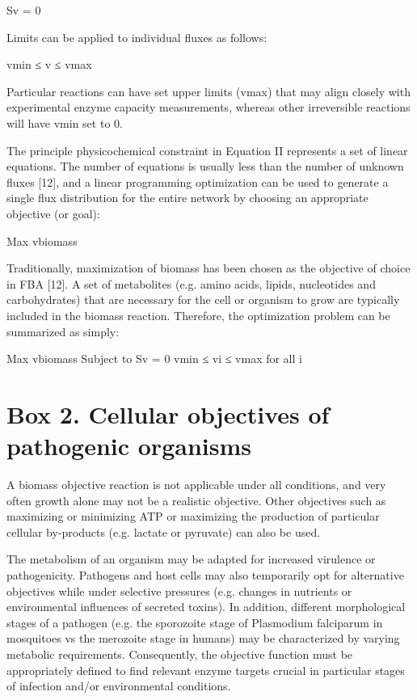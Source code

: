 Sv = 0

Limits can be applied to individual fluxes as follows:

vmin ≤ v ≤ vmax

Particular reactions can have set upper limits (vmax) that 
may align closely with experimental enzyme capacity measurements, 
whereas other irreversible reactions will have vmin set to 0.

The principle physicochemical constraint in Equation II 
represents a set of linear equations. The number of 
equations is usually less than the number of unknown 
fluxes [12], and a linear programming optimization can be 
used to generate a single flux distribution for the entire 
network by choosing an appropriate objective (or goal): 

Max vbiomass

Traditionally, maximization of biomass has been 
chosen as the objective of choice in FBA [12]. A set 
of metabolites (e.g. amino acids, lipids, nucleotides and 
carbohydrates) that are necessary for the cell or organism 
to grow are typically included in the biomass reaction. 
Therefore, the optimization problem can be summarized as simply:

Max vbiomass
Subject to	Sv = 0
vmin ≤ vi ≤ vmax	 for all i

\section{Box 2. Cellular objectives of pathogenic organisms}
A biomass objective reaction is not applicable under 
all conditions, and very often growth alone may not be 
a realistic objective. Other objectives such as maximizing 
or minimizing ATP or maximizing the production of 
particular cellular by-products (e.g. lactate or pyruvate) 
can also be used.

The metabolism of an organism may be adapted for increased 
virulence or pathogenicity. Pathogens and host cells may 
also temporarily opt for alternative objectives while under 
selective pressures (e.g. changes in nutrients or 
environmental influences of secreted toxins). In addition, 
different morphological stages of a pathogen (e.g. the sporozoite 
stage of Plasmodium falciparum in mosquitoes vs the merozoite 
stage in humans) may be characterized by varying metabolic 
requirements. Consequently, the objective function must be 
appropriately defined to find relevant enzyme targets crucial 
in particular stages of infection and/or environmental conditions.


